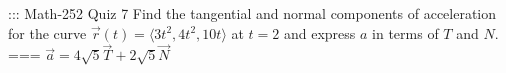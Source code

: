 ::: Math-252 Quiz 7
Find the tangential and normal components of acceleration for the curve
\(\vec r(t)=\langle 3t^2,4t^2,10t\rangle\) at \(t=2\) and express \(a\) in terms
of \(T\) and \(N\).
===
\(\vec a=4\sqrt 5\vec T+2\sqrt 5\vec N\)
